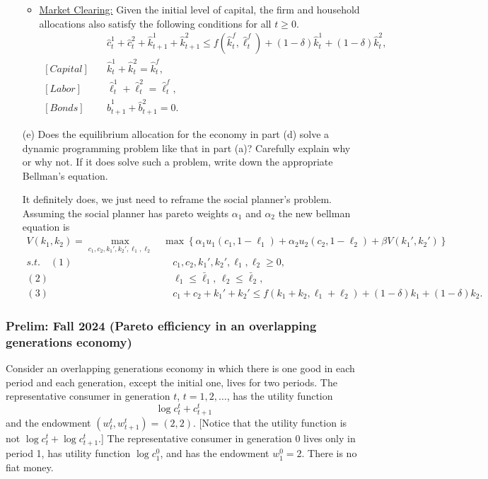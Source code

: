 \documentclass[11pt,english]{article}
\begin{document}
\begin{enumerate}
\begin{solution}
\begin{itemize}
\item \underline{Market Clearing:} Given the initial level of capital, the firm and household allocations also satisfy the following conditions for all $t\geq 0$.
\begin{align*}
[Goods]&\quad \hat{c}_t^1 + \hat{c}_t^2 + \hat{k}_{t+1}^1 + \hat{k}_{t+1}^2 \leq f\left(\hat{k}_t^f, \hat{\ell}_t^f\right) + (1 - \delta)\hat{k}_t^1 + (1 - \delta)\hat{k}_t^2,\\
[Capital]&\quad \hat{k}_t^1 + \hat{k}_t^2 = \hat{k}_t^f,\\
[Labor]&\quad \hat{\ell}_t^1 + \hat{\ell}^2_t = \hat{\ell}_t^f,\\
[Bonds]&\quad \hat{b}_{t+1}^1 + \hat{b}_{t+1}^2 = 0.
\end{align*}
\end{itemize}
    \end{solution}
 
    \item[(e)] Does the equilibrium allocation for the economy in part (d) solve
        a dynamic programming problem like that in part (a)? Carefully explain
        why or why not. If it does solve such a problem, write down the
        appropriate Bellman's equation.
    \begin{solution}
 It definitely does, we just need to reframe the social planner's problem. Assuming the social planner has pareto weights $\alpha_1$ and $\alpha_2$ the new bellman equation is
\begin{align*}
V(k_1, k_2) = \max_{c_1, c_2, k_1', k_2', \ell_1, \ell_2}&\max\left\{ \alpha_1 u_1(c_1, 1 - \ell_1) + \alpha_2 u_2 (c_2, 1 - \ell_2) + \beta V(k_1', k_2')\right\}\\
s.t.\quad (1)&\quad c_1, c_2 , k_1', k_2', \ell_1, \ell_2 \geq 0,\\
(2)&\quad \ell_1 \leq \bar{\ell}_1,\, \ell_2 \leq \bar{\ell}_2,\\
(3)&\quad  c_1 + c_2 + k_1' + k_2' \leq f\left(k _1 + k_2, \ell_1 + \ell_2\right) + (1 - \delta)k_1 + (1 - \delta)k_2.
\end{align*}

    \end{solution}
\end{enumerate}

\subsubsection{Prelim: Fall 2024 (Pareto efficiency in an overlapping generations economy)}
Consider an overlapping generations economy in which there is one good in each
period and each generation, except the initial one, lives for two periods. The
representative consumer in generation $t$, $t = 1, 2, \ldots$, has the utility
function
\[
    \log c_t^t + c_{t+1}^t
\]
and the endowment $(w_t^t, w_{t+1}^t) = (2, 2)$. [Notice that the utility
function is not $\log c_t^t + \log c_{t+1}^t$.]  The representative consumer
in generation 0 lives only in period 1, has utility function $\log c_1^0$, and
has the endowment $w_1^0 = 2$. There is no fiat money.
 
\end{document}
